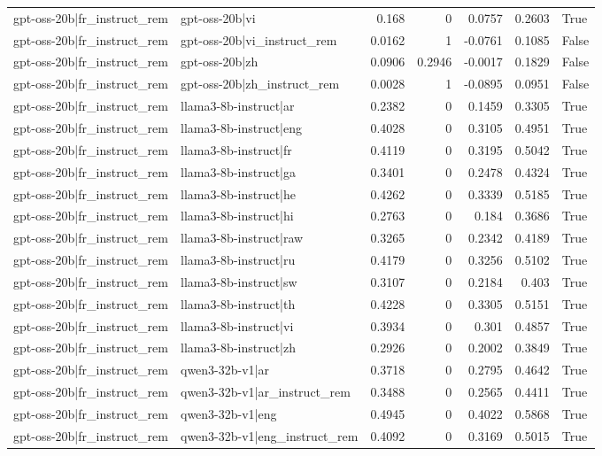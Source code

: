 \begin{table}
\begin{tabular}{l l r r r r l}
gpt-oss-20b|fr_instruct_rem & gpt-oss-20b|vi & 0.168 & 0 & 0.0757 & 0.2603 & True \\
gpt-oss-20b|fr_instruct_rem & gpt-oss-20b|vi_instruct_rem & 0.0162 & 1 & -0.0761 & 0.1085 & False \\
gpt-oss-20b|fr_instruct_rem & gpt-oss-20b|zh & 0.0906 & 0.2946 & -0.0017 & 0.1829 & False \\
gpt-oss-20b|fr_instruct_rem & gpt-oss-20b|zh_instruct_rem & 0.0028 & 1 & -0.0895 & 0.0951 & False \\
gpt-oss-20b|fr_instruct_rem & llama3-8b-instruct|ar & 0.2382 & 0 & 0.1459 & 0.3305 & True \\
gpt-oss-20b|fr_instruct_rem & llama3-8b-instruct|eng & 0.4028 & 0 & 0.3105 & 0.4951 & True \\
gpt-oss-20b|fr_instruct_rem & llama3-8b-instruct|fr & 0.4119 & 0 & 0.3195 & 0.5042 & True \\
gpt-oss-20b|fr_instruct_rem & llama3-8b-instruct|ga & 0.3401 & 0 & 0.2478 & 0.4324 & True \\
gpt-oss-20b|fr_instruct_rem & llama3-8b-instruct|he & 0.4262 & 0 & 0.3339 & 0.5185 & True \\
gpt-oss-20b|fr_instruct_rem & llama3-8b-instruct|hi & 0.2763 & 0 & 0.184 & 0.3686 & True \\
gpt-oss-20b|fr_instruct_rem & llama3-8b-instruct|raw & 0.3265 & 0 & 0.2342 & 0.4189 & True \\
gpt-oss-20b|fr_instruct_rem & llama3-8b-instruct|ru & 0.4179 & 0 & 0.3256 & 0.5102 & True \\
gpt-oss-20b|fr_instruct_rem & llama3-8b-instruct|sw & 0.3107 & 0 & 0.2184 & 0.403 & True \\
gpt-oss-20b|fr_instruct_rem & llama3-8b-instruct|th & 0.4228 & 0 & 0.3305 & 0.5151 & True \\
gpt-oss-20b|fr_instruct_rem & llama3-8b-instruct|vi & 0.3934 & 0 & 0.301 & 0.4857 & True \\
gpt-oss-20b|fr_instruct_rem & llama3-8b-instruct|zh & 0.2926 & 0 & 0.2002 & 0.3849 & True \\
gpt-oss-20b|fr_instruct_rem & qwen3-32b-v1|ar & 0.3718 & 0 & 0.2795 & 0.4642 & True \\
gpt-oss-20b|fr_instruct_rem & qwen3-32b-v1|ar_instruct_rem & 0.3488 & 0 & 0.2565 & 0.4411 & True \\
gpt-oss-20b|fr_instruct_rem & qwen3-32b-v1|eng & 0.4945 & 0 & 0.4022 & 0.5868 & True \\
gpt-oss-20b|fr_instruct_rem & qwen3-32b-v1|eng_instruct_rem & 0.4092 & 0 & 0.3169 & 0.5015 & True \\

\end{tabular}
\end{table}
